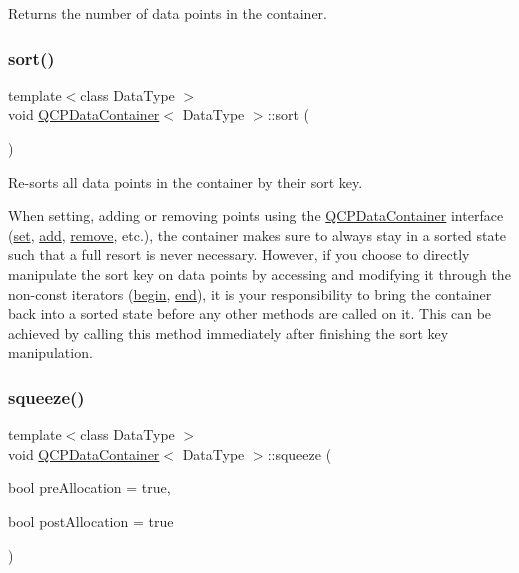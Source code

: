 Returns the number of data points in the container. \mbox{\label{class_q_c_p_data_container_a75da92e33063b63d6da5014683591d45}} 
\subsubsection{\texorpdfstring{sort()}{sort()}}
{\footnotesize\ttfamily template$<$class Data\+Type $>$ \\
void \hyperlink{class_q_c_p_data_container}{Q\+C\+P\+Data\+Container}$<$ Data\+Type $>$\+::sort (\begin{DoxyParamCaption}{ }\end{DoxyParamCaption})}

Re-\/sorts all data points in the container by their sort key.

When setting, adding or removing points using the \hyperlink{class_q_c_p_data_container}{Q\+C\+P\+Data\+Container} interface (\hyperlink{class_q_c_p_data_container_ae7042bd534fc3ce7befa2ce3f790b5bf}{set}, \hyperlink{class_q_c_p_data_container_a42b98bd994307ccd163a43d576f91ad9}{add}, \hyperlink{class_q_c_p_data_container_ae5f569a120648b167efa78835f12fd38}{remove}, etc.), the container makes sure to always stay in a sorted state such that a full resort is never necessary. However, if you choose to directly manipulate the sort key on data points by accessing and modifying it through the non-\/const iterators (\hyperlink{class_q_c_p_data_container_a80032518413ab8f418f7c81182fd06cb}{begin}, \hyperlink{class_q_c_p_data_container_acf66dfad83fe041380f5e0491e7676f2}{end}), it is your responsibility to bring the container back into a sorted state before any other methods are called on it. This can be achieved by calling this method immediately after finishing the sort key manipulation. \mbox{\label{class_q_c_p_data_container_a82fcc511def22287fc62579d0706387c}} 
\subsubsection{\texorpdfstring{squeeze()}{squeeze()}}
{\footnotesize\ttfamily template$<$class Data\+Type $>$ \\
void \hyperlink{class_q_c_p_data_container}{Q\+C\+P\+Data\+Container}$<$ Data\+Type $>$\+::squeeze (\begin{DoxyParamCaption}\item[{bool}]{pre\+Allocation = {\ttfamily true},  }\item[{bool}]{post\+Allocation = {\ttfamily true} }\end{DoxyParamCaption})}

